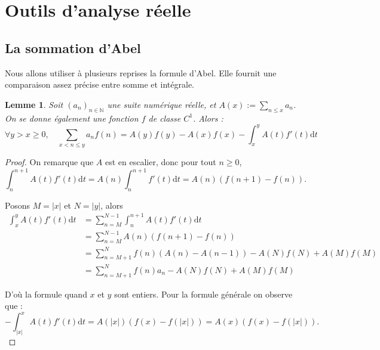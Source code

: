 \documentclass[french]{report}
\newtheorem{lemma}[theorem]{Lemme}
\begin{document}
\section{Outils d'analyse réelle}

\subsection{La sommation d'Abel}

Nous allons utiliser à plusieurs reprises la formule d'Abel. Elle fournit une comparaison assez précise entre somme et intégrale.

\begin{lemma}\label{lem:formule-abel}
  Soit $(a_n)_{n\in\mathbb{N}}$ une suite numérique réelle, et $A(x):=\sum_{n\leq x}a_n$. On se donne également une fonction $f$ de classe $C^1$. Alors :
  \[ \forall y>x\geq0,\quad
  \sum_{x<n\leq y} a_n f(n)
  = A(y)f(y) - A(x)f(x)
  - \int_x^yA(t)f'(t)\mathrm{d}t
  \]
\end{lemma}

\begin{proof}
  On remarque que $A$ est en escalier, donc pour tout $n\geq0$,
  \[ \int_n^{n+1}A(t)f'(t)\mathrm{d}t
  = A(n)\int_n^{n+1}f'(t)\mathrm{d}t
  = A(n)(f(n+1)-f(n)).
  \]

  Posons $M=|x|$ et $N=|y|$, alors
  \begin{align*}
    \int_x^yA(t)f'(t)\mathrm{d}t
    &= \sum_{n=M}^{N-1}\int_n^{n+1}A(t)f'(t)\mathrm{d}t \\
    &= \sum_{n=M}^{N-1}A(n)(f(n+1)-f(n)) \\
    &= \sum_{n=M+1}^Nf(n)(A(n)-A(n-1))-A(N)f(N)+A(M)f(M) \\
    &= \sum_{n=M+1}^Nf(n)a_n-A(N)f(N)+A(M)f(M)
  \end{align*}

  D'où la formule quand $x$ et $y$ sont entiers. Pour la formule générale on observe que :
  \[ -\int_{|x|}^xA(t)f'(t)\mathrm{d}t = A(|x|)(f(x)-f(|x|)) = A(x)(f(x)-f(|x|)). \]
  
\end{proof}

\end{document}
